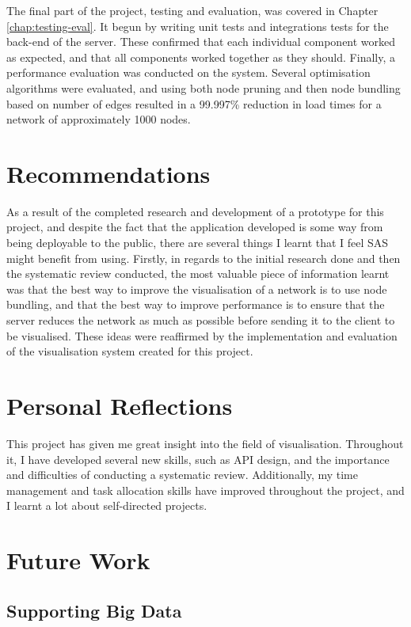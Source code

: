 \documentclass[../dissertation.tex]{subfiles}
\begin{document}
The final part of the project, testing and evaluation, was covered in Chapter \ref{chap:testing-eval}. It begun by writing unit tests and integrations tests for the back-end of the server. These confirmed that each individual component worked as expected, and that all components worked together as they should. Finally, a performance evaluation was conducted on the system. Several optimisation algorithms were evaluated, and using both node pruning and then node bundling based on number of edges resulted in a 99.997\% reduction in load times for a network of approximately 1000 nodes. 

\section{Recommendations}

As a result of the completed research and development of a prototype for this project, and despite the fact that the application developed is some way from being deployable to the public, there are several things I learnt that I feel SAS might benefit from using. Firstly, in regards to the initial research done and then the systematic review conducted, the most valuable piece of information learnt was that the best way to improve the visualisation of a network is to use node bundling, and that the best way to improve performance is to ensure that the server reduces the network as much as possible before sending it to the client to be visualised. These ideas were reaffirmed by the implementation and evaluation of the visualisation system created for this project.

\section{Personal Reflections}

This project has given me great insight into the field of visualisation. Throughout it, I have developed several new skills, such as API design, and the importance and difficulties of conducting a systematic review. Additionally, my time management and task allocation skills have improved throughout the project, and I learnt a lot about self-directed projects.

\section{Future Work}
\label{sec:further_ideas}

\subsection{Supporting Big Data}
\end{document}
